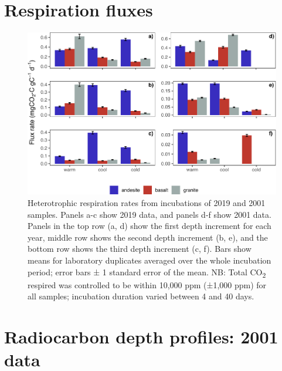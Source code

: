 \documentclass[english,man,floatsintext]{apa6}
\begin{document}
\clearpage

\hypertarget{respiration-fluxes}{%
\section{Respiration fluxes}\label{respiration-fluxes}}



\begin{figure}

{\centering \includegraphics{sra-blk-inc-SI_files/figure-latex/plot-cmtv-flx-rates-1} 

}

\caption{Heterotrophic respiration rates from incubations of 2019 and 2001 samples. Panels a-c show 2019 data, and panels d-f show 2001 data. Panels in the top row (a, d) show the first depth increment for each year, middle row shows the second depth increment (b, e), and the bottom row shows the third depth increment (c, f). Bars show means for laboratory duplicates averaged over the whole incubation period; error bars ± 1 standard error of the mean. NB: Total CO\textsubscript{2} respired was controlled to be within 10,000 ppm (±1,000 ppm) for all samples; incubation duration varied between 4 and 40 days.}\label{fig:plot-cmtv-flx-rates}
\end{figure}

\clearpage

\hypertarget{radiocarbon-depth-profiles-2001-data}{%
\section{Radiocarbon depth profiles: 2001 data}\label{radiocarbon-depth-profiles-2001-data}}
\end{document}
